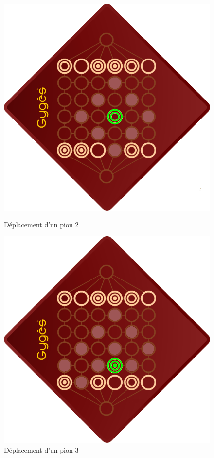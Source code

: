 \begin{enumerate}
\begin{figure}[h!]
\begin{minipage}[h]{0.25\linewidth}
				\includegraphics[width=\textwidth]{images/move2.png}
				\caption{Déplacement d'un pion 2}
				\label{fig:figure2}
				\end{minipage}
				\hspace{0.5cm}
				\begin{minipage}[h]{0.25\linewidth}
				\centering
				\includegraphics[width=\textwidth]{images/move3.png}
				\caption{Déplacement d'un pion 3}
				\label{fig:figure3}
				\end{minipage}
				\vspace{-1em}
			\end{figure}


\end{enumerate}
